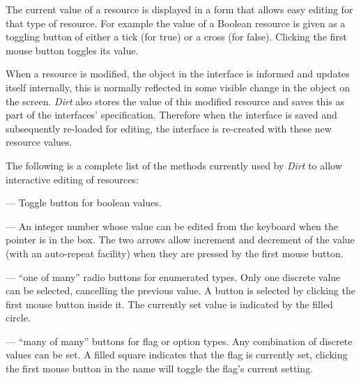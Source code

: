 The current value of a resource is displayed in a form that allows easy
editing for that type of resource.  For example the value of a Boolean
resource is given as a toggling button of either a tick (for true) or a cross
(for false).  Clicking the first mouse button toggles its value.

When a resource is modified, the object in the interface is informed and
updates itself internally, this is normally reflected in some visible change
in the object on the screen.  {\em Dirt} also stores the value of this
modified resource and saves this as part of the interfaces' specification.
Therefore when the interface is saved and subsequently re-loaded for editing,
the interface is re-created with these new resource values.

The following is a complete list of the methods currently used by {\em Dirt}
to allow interactive editing of resources:

\begin{minipage}[t]{0.25in}
\end{minipage}
--- Toggle button for boolean values.

\vspace{.1in}
\begin{minipage}[t]{0.7in}
\end{minipage}
--- An integer number
whose value can be edited from the keyboard when the pointer is in the box.
The two arrows allow increment and decrement of the value (with an
auto-repeat facility) when they are pressed by the first mouse button.

\vspace{.1in}
\begin{minipage}[t]{2in}
\end{minipage}
--- ``one of many''
radio buttons for enumerated types. Only one discrete value can be selected,
cancelling the previous value. A button is selected by clicking the first
mouse button inside it. The currently set value is indicated by the filled
circle.

\vspace{.1in}
\begin{minipage}[t]{1.5in}
\end{minipage}
--- ``many of many''
buttons for flag or option types.  Any combination of discrete values
can be set.  A filled square indicates that the flag is currently set,
clicking the first mouse button in the name will toggle the flag's current
setting.

